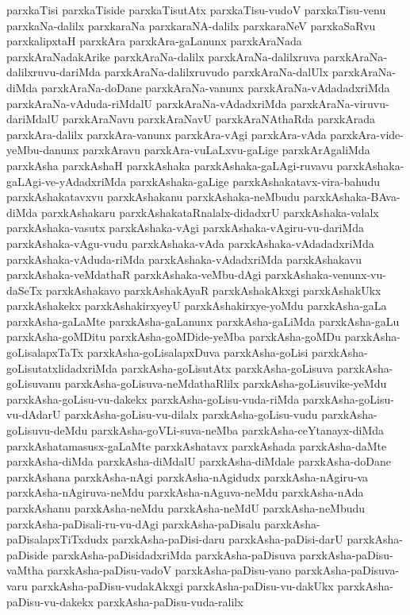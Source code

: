 {parxkaTisi
parxkaTiside
parxkaTisutAtx
parxkaTisu-vudoV
parxkaTisu-venu
parxkaNa-dalilx
parxkaraNa
parxkaraNA-dalilx
parxkaraNeV
parxkaSaRvu
parxkalipxtaH
parxkAra
parxkAra-gaLanunx
parxkAraNada
parxkAraNadakArike
parxkAraNa-dalilx
parxkAraNa-dalilxruva
parxkAraNa-dalilxruvu-dariMda
parxkAraNa-dalilxruvudo
parxkAraNa-dalUlx
parxkAraNa-diMda
parxkAraNa-doDane
parxkAraNa-vanunx
parxkAraNa-vAdadadxriMda
parxkAraNa-vAduda-riMdalU
parxkAraNa-vAdadxriMda
parxkAraNa-viruvu-dariMdalU
parxkAraNavu
parxkAraNavU
parxkAraNAthaRda
parxkArada
parxkAra-dalilx
parxkAra-vanunx
parxkAra-vAgi
parxkAra-vAda
parxkAra-vide-yeMbu-danunx
parxkAravu
parxkAra-vuLaLxvu-gaLige
parxkArAgaliMda
parxkAsha
parxkAshaH
parxkAshaka
parxkAshaka-gaLAgi-ruvavu
parxkAshaka-gaLAgi-ve-yAdadxriMda
parxkAshaka-gaLige
parxkAshakatavx-vira-bahudu
parxkAshakatavxvu
parxkAshakanu
parxkAshaka-neMbudu
parxkAshaka-BAva-diMda
parxkAshakaru
parxkAshakataRnalalx-didadxrU
parxkAshaka-valalx
parxkAshaka-vasutx
parxkAshaka-vAgi
parxkAshaka-vAgiru-vu-dariMda
parxkAshaka-vAgu-vudu
parxkAshaka-vAda
parxkAshaka-vAdadadxriMda
parxkAshaka-vAduda-riMda
parxkAshaka-vAdadxriMda
parxkAshakavu
parxkAshaka-veMdathaR
parxkAshaka-veMbu-dAgi
parxkAshaka-venunx-vu-daSeTx
parxkAshakavo
parxkAshakAyaR
parxkAshakAkxgi
parxkAshakUkx
parxkAshakekx
parxkAshakirxyeyU
parxkAshakirxye-yoMdu
parxkAsha-gaLa
parxkAsha-gaLaMte
parxkAsha-gaLanunx
parxkAsha-gaLiMda
parxkAsha-gaLu
parxkAsha-goMDitu
parxkAsha-goMDide-yeMba
parxkAsha-goMDu
parxkAsha-goLisalapxTaTx
parxkAsha-goLisalapxDuva
parxkAsha-goLisi
parxkAsha-goLisutatxlidadxriMda
parxkAsha-goLisutAtx
parxkAsha-goLisuva
parxkAsha-goLisuvanu
parxkAsha-goLisuva-neMdathaRlilx
parxkAsha-goLisuvike-yeMdu
parxkAsha-goLisu-vu-dakekx
parxkAsha-goLisu-vuda-riMda
parxkAsha-goLisu-vu-dAdarU
parxkAsha-goLisu-vu-dilalx
parxkAsha-goLisu-vudu
parxkAsha-goLisuvu-deMdu
parxkAsha-goVLi-suva-neMba
parxkAsha-ceYtanayx-diMda
parxkAshatamasusx-gaLaMte
parxkAshatavx
parxkAshada
parxkAsha-daMte
parxkAsha-diMda
parxkAsha-diMdalU
parxkAsha-diMdale
parxkAsha-doDane
parxkAshana
parxkAsha-nAgi
parxkAsha-nAgidudx
parxkAsha-nAgiru-va
parxkAsha-nAgiruva-neMdu
parxkAsha-nAguva-neMdu
parxkAsha-nAda
parxkAshanu
parxkAsha-neMdu
parxkAsha-neMdU
parxkAsha-neMbudu
parxkAsha-paDisali-ru-vu-dAgi
parxkAsha-paDisalu
parxkAsha-paDisalapxTiTxdudx
parxkAsha-paDisi-daru
parxkAsha-paDisi-darU
parxkAsha-paDiside
parxkAsha-paDisidadxriMda
parxkAsha-paDisuva
parxkAsha-paDisu-vaMtha
parxkAsha-paDisu-vadoV
parxkAsha-paDisu-vano
parxkAsha-paDisuva-varu
parxkAsha-paDisu-vudakAkxgi
parxkAsha-paDisu-vu-dakUkx
parxkAsha-paDisu-vu-dakekx
parxkAsha-paDisu-vuda-ralilx
}
